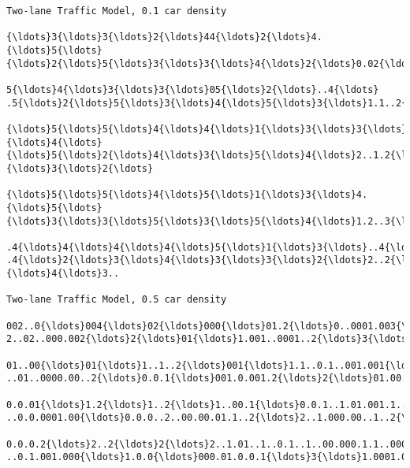 \documentclass[11pt]{article}
\begin{document}
    \begin{Verbatim}[commandchars=\\\{\},fontsize=\footnotesize]
Two-lane Traffic Model, 0.1 car density

{\ldots}3{\ldots}3{\ldots}2{\ldots}44{\ldots}2{\ldots}4.{\ldots}5{\ldots}
{\ldots}2{\ldots}5{\ldots}3{\ldots}3{\ldots}4{\ldots}2{\ldots}0.02{\ldots}.1{\ldots}2{\ldots}5{\ldots}

5{\ldots}4{\ldots}3{\ldots}3{\ldots}05{\ldots}2{\ldots}..4{\ldots}
.5{\ldots}2{\ldots}5{\ldots}3{\ldots}4{\ldots}5{\ldots}3{\ldots}1.1..2{\ldots}..2{\ldots}2{\ldots}

{\ldots}5{\ldots}5{\ldots}4{\ldots}4{\ldots}1{\ldots}3{\ldots}3{\ldots}{\ldots}4{\ldots}
{\ldots}5{\ldots}2{\ldots}4{\ldots}3{\ldots}5{\ldots}4{\ldots}2..1.2{\ldots}3{\ldots}{\ldots}3{\ldots}2{\ldots}

{\ldots}5{\ldots}5{\ldots}4{\ldots}5{\ldots}1{\ldots}3{\ldots}4.{\ldots}5{\ldots}
{\ldots}3{\ldots}3{\ldots}5{\ldots}3{\ldots}5{\ldots}4{\ldots}1.2..3{\ldots}4{\ldots}4{\ldots}3.

.4{\ldots}4{\ldots}4{\ldots}4{\ldots}5{\ldots}1{\ldots}3{\ldots}..4{\ldots}
.4{\ldots}2{\ldots}3{\ldots}4{\ldots}3{\ldots}3{\ldots}2{\ldots}2..2{\ldots}3..{\ldots}4{\ldots}3..

Two-lane Traffic Model, 0.5 car density

002..0{\ldots}004{\ldots}02{\ldots}000{\ldots}01.2{\ldots}0..0001.003{\ldots}1.001..00000001..0.2..1..3{\ldots}001.00004{\ldots}01.
2..02..000.002{\ldots}2{\ldots}01{\ldots}1.001..0001..2{\ldots}3{\ldots}0.00.00.1..0{\ldots}00001{\ldots}000002{\ldots}000.0{\ldots}01..00000

01..00{\ldots}01{\ldots}1..1..2{\ldots}001{\ldots}1.1..0.1..001.001{\ldots}0.000.1.0000000.0.0{\ldots}1.2{\ldots}000.00001{\ldots}00.0
..01..0000.00..2{\ldots}0.0.1{\ldots}001.0.001.2{\ldots}2{\ldots}01.00.00..0.1{\ldots}0000.1{\ldots}00001..1.001.1{\ldots}1.1.00000

0.0.01{\ldots}1.2{\ldots}1..2{\ldots}1..00.1{\ldots}0.0.1..1.01.001.1..1.000..00000000.1.0{\ldots}2..2..001.0001.1{\ldots}01.0
..0.0.0001.00{\ldots}0.0.0..2..00.00.01.1..2{\ldots}2..1.000.00..1..2{\ldots}0000..2{\ldots}0000.2..000.0.2{\ldots}1.000000

0.0.0.2{\ldots}2..2{\ldots}2{\ldots}2..1.01..1..0.1..1..00.000.1.1..0001..00000000..00{\ldots}1..001.0000.1.2..0.00
..0.1.001.000{\ldots}1.0.0{\ldots}000.01.0.0.1{\ldots}3{\ldots}1.0001.01{\ldots}2{\ldots}2..0001{\ldots}1.0001{\ldots}0000.0{\ldots}2..0000001


\end{Verbatim}
\end{document}
